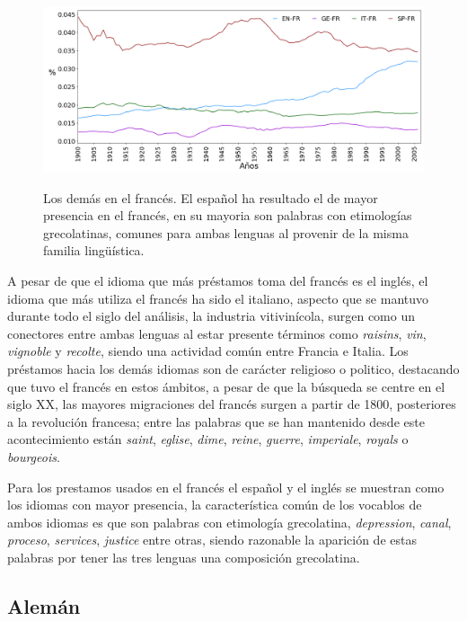 \begin{figure}[h!]
	\centering
	\includegraphics[scale=.36]{Cap_4/PF2_S2_FR.png}
	\label{fig.ST_b_FR}
	\caption{Los demás en el francés. El español ha resultado el de mayor presencia en el francés, en su mayoria son palabras con etimologías grecolatinas, comunes para ambas lenguas al provenir de la misma familia lingüística.}
\end{figure}
		
\clearpage


A pesar de que el idioma que más préstamos toma del francés es el inglés,  el idioma que más utiliza el francés ha sido el italiano,  aspecto que se mantuvo durante todo el siglo del análisis,  la industria vitivinícola, surgen como un conectores entre ambas lenguas al estar presente términos como  \textit{raisins}, \textit{vin}, \textit{vignoble} y \textit{recolte},  siendo una actividad común entre Francia e Italia.  Los préstamos hacia los demás idiomas son de carácter religioso o politico, destacando que tuvo el francés en estos ámbitos, a pesar de que la búsqueda se centre en el siglo XX, las mayores migraciones del francés surgen a partir de 1800, posteriores a la revolución francesa; entre las palabras que se han mantenido desde este acontecimiento están  \textit{saint}, \textit{eglise}, \textit{dime}, \textit{reine}, \textit{guerre}, \textit{imperiale}, \textit{royals} o \textit{bourgeois}.  


Para los prestamos usados en el francés el español y el inglés se muestran como los idiomas con mayor presencia, la característica común de los vocablos de ambos idiomas es que son palabras con etimología grecolatina, 
\textit{depression}, \textit{canal}, \textit{proceso}, \textit{services}, \textit{justice} entre otras,  siendo razonable la aparición de estas palabras por tener las tres lenguas una composición grecolatina. 


\clearpage
\subsection{Alemán}

